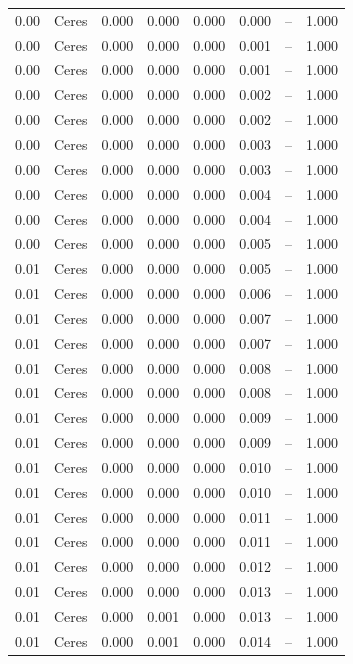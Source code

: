 \begin{table}[H]
\begin{tabular}{l c l l l}
0.00 & Ceres & 0.000 & 0.000 & 0.000 & 0.000 & -- & 1.000 \\
0.00 & Ceres & 0.000 & 0.000 & 0.000 & 0.001 & -- & 1.000 \\
0.00 & Ceres & 0.000 & 0.000 & 0.000 & 0.001 & -- & 1.000 \\
0.00 & Ceres & 0.000 & 0.000 & 0.000 & 0.002 & -- & 1.000 \\
0.00 & Ceres & 0.000 & 0.000 & 0.000 & 0.002 & -- & 1.000 \\
0.00 & Ceres & 0.000 & 0.000 & 0.000 & 0.003 & -- & 1.000 \\
0.00 & Ceres & 0.000 & 0.000 & 0.000 & 0.003 & -- & 1.000 \\
0.00 & Ceres & 0.000 & 0.000 & 0.000 & 0.004 & -- & 1.000 \\
0.00 & Ceres & 0.000 & 0.000 & 0.000 & 0.004 & -- & 1.000 \\
0.00 & Ceres & 0.000 & 0.000 & 0.000 & 0.005 & -- & 1.000 \\
0.01 & Ceres & 0.000 & 0.000 & 0.000 & 0.005 & -- & 1.000 \\
0.01 & Ceres & 0.000 & 0.000 & 0.000 & 0.006 & -- & 1.000 \\
0.01 & Ceres & 0.000 & 0.000 & 0.000 & 0.007 & -- & 1.000 \\
0.01 & Ceres & 0.000 & 0.000 & 0.000 & 0.007 & -- & 1.000 \\
0.01 & Ceres & 0.000 & 0.000 & 0.000 & 0.008 & -- & 1.000 \\
0.01 & Ceres & 0.000 & 0.000 & 0.000 & 0.008 & -- & 1.000 \\
0.01 & Ceres & 0.000 & 0.000 & 0.000 & 0.009 & -- & 1.000 \\
0.01 & Ceres & 0.000 & 0.000 & 0.000 & 0.009 & -- & 1.000 \\
0.01 & Ceres & 0.000 & 0.000 & 0.000 & 0.010 & -- & 1.000 \\
0.01 & Ceres & 0.000 & 0.000 & 0.000 & 0.010 & -- & 1.000 \\
0.01 & Ceres & 0.000 & 0.000 & 0.000 & 0.011 & -- & 1.000 \\
0.01 & Ceres & 0.000 & 0.000 & 0.000 & 0.011 & -- & 1.000 \\
0.01 & Ceres & 0.000 & 0.000 & 0.000 & 0.012 & -- & 1.000 \\
0.01 & Ceres & 0.000 & 0.000 & 0.000 & 0.013 & -- & 1.000 \\
0.01 & Ceres & 0.000 & 0.001 & 0.000 & 0.013 & -- & 1.000 \\
0.01 & Ceres & 0.000 & 0.001 & 0.000 & 0.014 & -- & 1.000 \\

\end{tabular}
\end{table}
